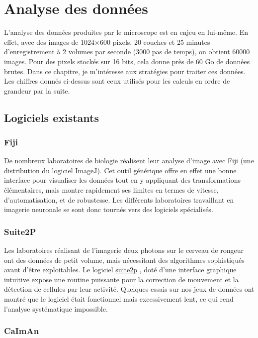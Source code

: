 \section{Analyse des données}

L'analyse des données produites par le microscope est en enjeu en lui-même. En effet, avec des images de 1024$\times$600 pixels, 20 couches et 25 minutes d'enregistrement à 2 volumes par seconde (3000 pas de temps), on obtient 60000 images. Pour des pixels stockés sur 16 bits, cela donne près de 60 Go de données brutes. Dans ce chapitre, je m'intéresse aux stratégies pour traiter ces données. Les chiffres donnés ci-dessus sont ceux utilisés pour les calculs en ordre de grandeur par la suite.

\subsection{Logiciels existants}

\subsubsection{Fiji}

De nombreux laboratoires de biologie réalisent leur analyse d'image avec Fiji (une distribution du logiciel ImageJ). Cet outil générique offre en effet une bonne interface pour visualiser les données tout en y appliquant des transformations élémentaires, mais montre rapidement ses limites en termes de vitesse, d'automatisation, et de robustesse. Les différents laboratoires travaillant en imagerie neuronale se sont donc tournés vers des logiciels spécialisés.

\subsubsection{Suite2P}

Les laboratoires réalisant de l'imagerie deux photons sur le cerveau de rongeur ont des données de petit volume, mais nécessitant des algorithmes sophistiqués avant d'être exploitables. Le logiciel \href{https://www.suite2p.org/}{suite2p} \cite{pachitariu_suite2p_2016}, doté d'une interface graphique intuitive expose une routine puissante pour la correction de mouvement et la détection de cellules par leur activité. Quelques essais sur nos jeux de données ont montré que le logiciel était fonctionnel mais excessivement lent, ce qui rend l'analyse systématique impossible.

\subsubsection{CaImAn}

